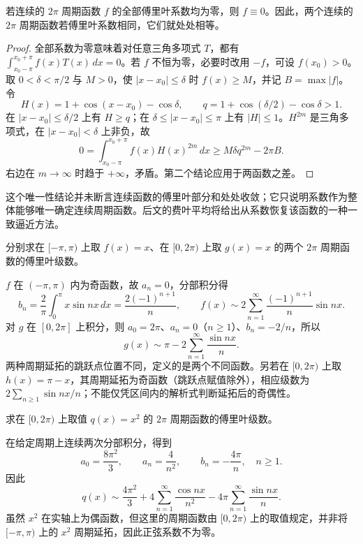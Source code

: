 \begin{theorem}[连续周期函数的傅里叶系数唯一性]
\label{thm:fourier-uniqueness-continuous}
若连续的 $2\pi$ 周期函数 $f$ 的全部傅里叶系数均为零，则 $f\equiv0$。因此，两个连续的 $2\pi$ 周期函数若傅里叶系数相同，它们就处处相等。
\end{theorem}

\begin{proof}
全部系数为零意味着对任意三角多项式 $T$，都有 $\int_{x_0-\pi}^{x_0+\pi}f(x)T(x)\,dx=0$。若 $f$ 不恒为零，必要时改用 $-f$，可设 $f(x_0)>0$。取 $0<\delta<\pi/2$ 与 $M>0$，使 $|x-x_0|\leq\delta$ 时 $f(x)\geq M$，并记 $B=\max|f|$。令
\[
    H(x)=1+\cos(x-x_0)-\cos\delta,
    \qquad q=1+\cos(\delta/2)-\cos\delta>1.
\]
在 $|x-x_0|\leq\delta/2$ 上有 $H\geq q$；在 $\delta\leq|x-x_0|\leq\pi$ 上有 $|H|\leq1$。$H^{2m}$ 是三角多项式，在 $|x-x_0|<\delta$ 上非负，故
\[
    0=\int_{x_0-\pi}^{x_0+\pi}f(x)H(x)^{2m}\,dx
       \geq M\delta q^{2m}-2\pi B.
\]
右边在 $m\to\infty$ 时趋于 $+\infty$，矛盾。第二个结论应用于两函数之差。
\end{proof}

这个唯一性结论并未断言连续函数的傅里叶部分和处处收敛；它只说明系数作为整体能够唯一确定连续周期函数。后文的费叶平均将给出从系数恢复该函数的一种一致逼近方法。

\begin{example}
\label{ex:fourier-sawtooth-and-period-choice}
分别求在 $[-\pi,\pi)$ 上取 $f(x)=x$、在 $[0,2\pi)$ 上取 $g(x)=x$ 的两个 $2\pi$ 周期函数的傅里叶级数。
\end{example}

\begin{solve}
$f$ 在 $(-\pi,\pi)$ 内为奇函数，故 $a_n=0$，分部积分得
\[
    b_n=\frac2\pi\int_0^\pi x\sin nx\,dx
        =\frac{2(-1)^{n+1}}n,
    \qquad
    f(x)\sim2\sum_{n=1}^\infty\frac{(-1)^{n+1}}n\sin nx.
\]
对 $g$ 在 $[0,2\pi]$ 上积分，则 $a_0=2\pi$、$a_n=0$（$n\geq1$）、$b_n=-2/n$，所以
\[
    g(x)\sim\pi-2\sum_{n=1}^\infty\frac{\sin nx}{n}.
\]
两种周期延拓的跳跃点位置不同，定义的是两个不同函数。另若在 $[0,2\pi)$ 上取 $h(x)=\pi-x$，其周期延拓为奇函数（跳跃点赋值除外），相应级数为 $2\sum_{n\geq1}\sin nx/n$；不能仅凭区间内的解析式判断延拓后的奇偶性。
\end{solve}

\begin{example}
\label{ex:fourier-square-on-shifted-period}
求在 $[0,2\pi)$ 上取值 $q(x)=x^2$ 的 $2\pi$ 周期函数的傅里叶级数。
\end{example}

\begin{solve}
在给定周期上连续两次分部积分，得到
\[
    a_0=\frac{8\pi^2}{3},\qquad
    a_n=\frac4{n^2},\qquad b_n=-\frac{4\pi}{n},\quad n\geq1.
\]
因此
\begin{equation}
    q(x)\sim\frac{4\pi^2}{3}
       +4\sum_{n=1}^\infty\frac{\cos nx}{n^2}
       -4\pi\sum_{n=1}^\infty\frac{\sin nx}{n}.
    \label{eq:fourier-square-shifted-period}
\end{equation}
虽然 $x^2$ 在实轴上为偶函数，但这里的周期函数由 $[0,2\pi)$ 上的取值规定，并非将 $[-\pi,\pi)$ 上的 $x^2$ 周期延拓，因此正弦系数不为零。
\end{solve}


